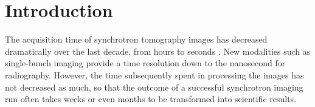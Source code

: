 \documentclass[twocolumn]{bmcart}%
\begin{document}
\begin{frontmatter}
\begin{abstractbox}

\begin{keyword}
\end{keyword}


\end{abstractbox}
%

\end{frontmatter}



\section*{Introduction}

The acquisition time of synchrotron tomography images has decreased
dramatically over the last decade, from hours to
seconds \citep{Maire2014}. New modalities such as single-bunch
imaging \citep{Rack2014} provide a time resolution down to the nanosecond
for radiography. However, the time subsequently spent in processing the
images has not decreased as much, so that the outcome of a successful
synchrotron imaging run often takes weeks or even months to be
transformed into scientific results. 
\end{document}

